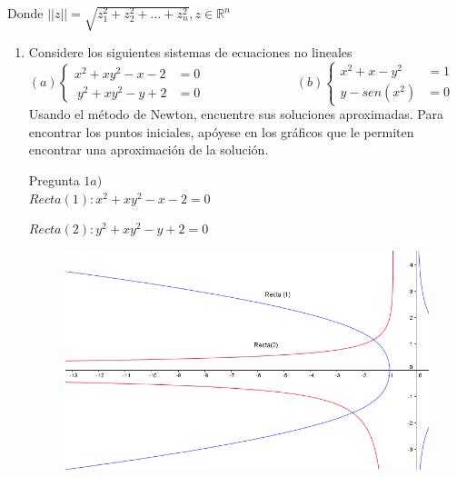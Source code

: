 \documentclass{udpreport}
\begin{document}
        Donde $||z||=\sqrt{z_{1}^{2} + z_{2}^2+...+z_{n}^{2}} , z \in \mathbb{R}^{n}$
    \begin{enumerate}   
        
        \item Considere los siguientes sistemas de ecuaciones no lineales\\
        
        \begin{math}
            (a)\left\lbrace
          \begin{array}{ll}
                x^2 + xy^2-x-2&=0 \\\
                y^2 + xy^2-y+2&=0
            \end{array}
            \right.
            \hspace{3cm}
            (b) \left\lbrace
           \begin{array}{ll}
                 x^2+x-y^2&=1  \\
                 y-sen(x^2)&=0 
            \end{array}
            \right.
        \end{math}\\
        
        Usando el método de Newton, encuentre sus soluciones aproximadas. Para encontrar los puntos iniciales, apóyese en los gráficos que le permiten encontrar una aproximación de la solución. 
        
        
        Pregunta $ 1a) $\\
        
            
            $ Recta(1) : x^2+xy^2-x-2=0 $
            
            $ Recta(2) : y^2 +xy^2-y+2=0 $
            
            \begin{figure}[h]
                \centering
                \includegraphics[width=15cm]{GraficoEcEj1a}
            \end{figure}
            

\end{enumerate}
\end{document}
